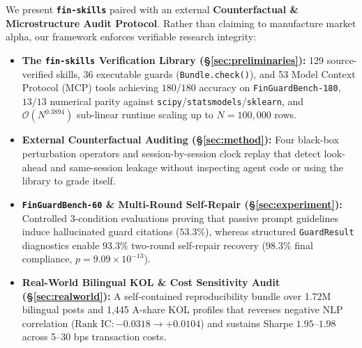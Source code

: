 We present \textbf{\texttt{fin-skills}} paired with an external \textbf{Counterfactual \& Microstructure Audit Protocol}. Rather than claiming to manufacture market alpha, our framework enforces verifiable research integrity:
\begin{itemize}
    \item \textbf{The \texttt{fin-skills} Verification Library (\S\ref{sec:preliminaries}):} 129 source-verified skills, 36 executable guards (\texttt{Bundle.check()}), and 53 Model Context Protocol (MCP) tools achieving $180/180$ accuracy on \texttt{FinGuardBench-180}, $13/13$ numerical parity against \texttt{scipy}/\texttt{statsmodels}/\texttt{sklearn}, and $\mathcal{O}(N^{0.3894})$ sub-linear runtime scaling up to $N=100{,}000$ rows.
    \item \textbf{External Counterfactual Auditing (\S\ref{sec:method}):} Four black-box perturbation operators and session-by-session clock replay that detect look-ahead and same-session leakage without inspecting agent code or using the library to grade itself.
    \item \textbf{\texttt{FinGuardBench-60} \& Multi-Round Self-Repair (\S\ref{sec:experiment}):} Controlled 3-condition evaluations proving that passive prompt guidelines induce hallucinated guard citations ($53.3\%$), whereas structured \texttt{GuardResult} diagnostics enable $93.3\%$ two-round self-repair recovery ($98.3\%$ final compliance, $p=9.09\times 10^{-13}$).
    \item \textbf{Real-World Bilingual KOL \& Cost Sensitivity Audit (\S\ref{sec:realworld}):} A self-contained reproducibility bundle over 1.72M bilingual posts and 1,445 A-share KOL profiles that reverses negative NLP correlation ($\text{Rank IC}: -0.0318 \to +0.0104$) and sustains Sharpe $1.95\text{--}1.98$ across 5--30 bps transaction costs.
\end{itemize}
